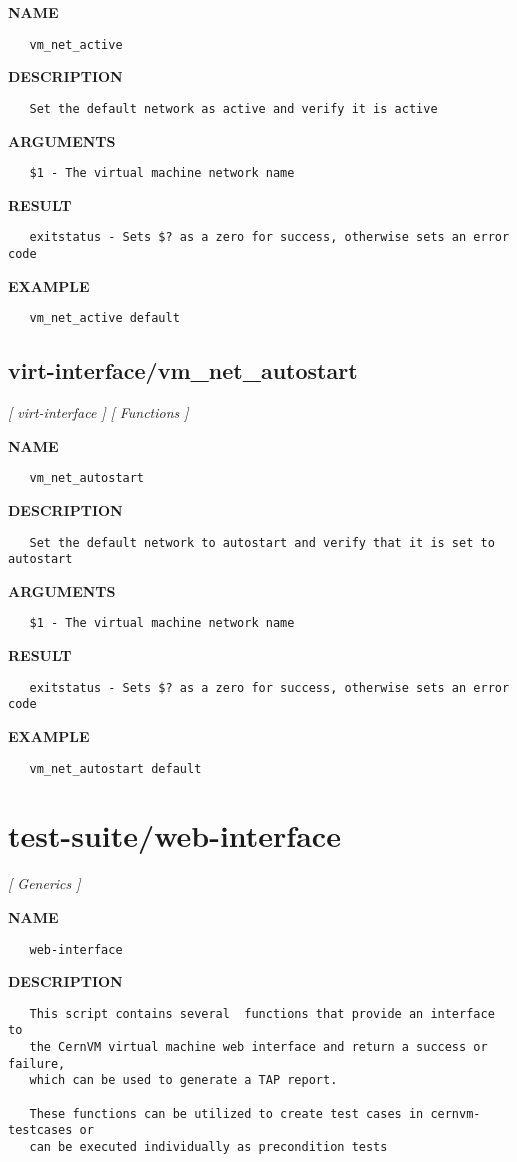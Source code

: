 \label{ch:robo57}
\label{ch:virt_interface_vm_net_active}
\textbf{NAME}
\begin{verbatim}
   vm_net_active
\end{verbatim}
\textbf{DESCRIPTION}
\begin{verbatim}
   Set the default network as active and verify it is active
\end{verbatim}
\textbf{ARGUMENTS}
\begin{verbatim}
   $1 - The virtual machine network name
\end{verbatim}
\textbf{RESULT}
\begin{verbatim}
   exitstatus - Sets $? as a zero for success, otherwise sets an error code
\end{verbatim}
\textbf{EXAMPLE}
\begin{verbatim}
   vm_net_active default
\end{verbatim}
\newpage
\subsection{virt-interface/vm\_net\_autostart}
\textsl{[ virt-interface ]}
\textsl{[ Functions ]}

\label{ch:robo58}
\label{ch:virt_interface_vm_net_autostart}
\textbf{NAME}
\begin{verbatim}
   vm_net_autostart
\end{verbatim}
\textbf{DESCRIPTION}
\begin{verbatim}
   Set the default network to autostart and verify that it is set to autostart
\end{verbatim}
\textbf{ARGUMENTS}
\begin{verbatim}
   $1 - The virtual machine network name
\end{verbatim}
\textbf{RESULT}
\begin{verbatim}
   exitstatus - Sets $? as a zero for success, otherwise sets an error code
\end{verbatim}
\textbf{EXAMPLE}
\begin{verbatim}
   vm_net_autostart default
\end{verbatim}
\newpage
\section{test-suite/web-interface}
\textsl{[ Generics ]}

\label{ch:robo37}
\label{ch:test_suite_web_interface}
\textbf{NAME}
\begin{verbatim}
   web-interface
\end{verbatim}
\textbf{DESCRIPTION}
\begin{verbatim}
   This script contains several  functions that provide an interface to
   the CernVM virtual machine web interface and return a success or failure, 
   which can be used to generate a TAP report.

   These functions can be utilized to create test cases in cernvm-testcases or 
   can be executed individually as precondition tests
\end{verbatim}
\newpage
